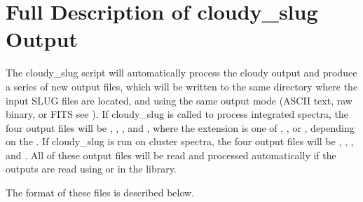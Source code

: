\documentclass[letterpaper,10pt,english]{sphinxmanual}
\begin{document}
\section{Full Description of cloudy\_slug Output}
\label{\detokenize{cloudy:full-description-of-cloudy-slug-output}}\label{\detokenize{cloudy:ssec-cloudy-output}}
The cloudy\_slug script will automatically process the cloudy output
and produce a series of new output files, which will be written to the
same directory where the input SLUG files are located, and using the
same output mode (ASCII text, raw binary, or FITS \textendash{} see
{\hyperref[\detokenize{output:sec-output}]{}}). If cloudy\_slug is called to process integrated
spectra, the four output files will be
,
,
, and
, where the extension 
is one of , , or , depending on the
. If cloudy\_slug is run on cluster spectra, the four
output files will be
,
,
, and
. All of these output files will
be read and processed automatically if the outputs are read using
 or  in the {\hyperref[\detokenize{slugpy:sec-slugpy}]{}}
library.

The format of these files is described below.
\end{document}
